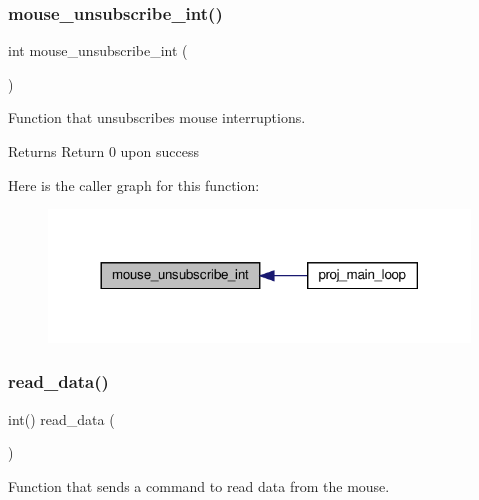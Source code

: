 \subsubsection{\texorpdfstring{mouse\+\_\+unsubscribe\+\_\+int()}{mouse\_unsubscribe\_int()}}
{\footnotesize\ttfamily int mouse\+\_\+unsubscribe\+\_\+int (\begin{DoxyParamCaption}{ }\end{DoxyParamCaption})}



Function that unsubscribes mouse interruptions. 

\begin{DoxyReturn}{Returns}
Return 0 upon success 
\end{DoxyReturn}
Here is the caller graph for this function\+:\nopagebreak
\begin{figure}[H]
\begin{center}
\leavevmode
\includegraphics[width=317pt]{group__mouse_ga685ad2706aca36d9869a30a19b9f446a_icgraph}
\end{center}
\end{figure}
\mbox{\label{group__mouse_gad25b8bf71166026dbf192c6d013d54d6}} 
\subsubsection{\texorpdfstring{read\+\_\+data()}{read\_data()}}
{\footnotesize\ttfamily int() read\+\_\+data (\begin{DoxyParamCaption}{ }\end{DoxyParamCaption})}



Function that sends a command to read data from the mouse. 

